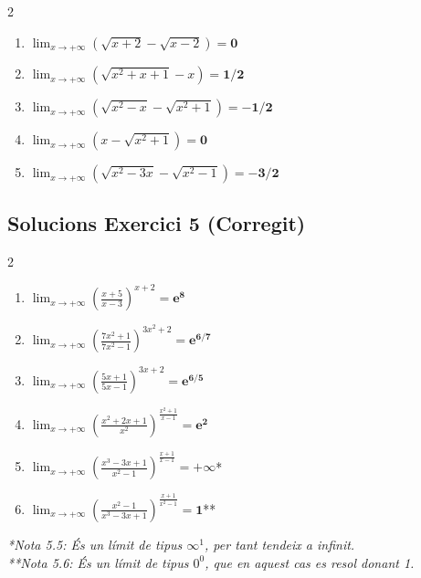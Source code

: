 \documentclass[12pt,a4paper]{article}
\begin{document}
\begin{multicols}{2}
\begin{enumerate}[label=4.\arabic*]
    \item $\displaystyle \lim_{x \to +\infty} (\sqrt{x+2}-\sqrt{x-2}) = \mathbf{0}$
    \item $\displaystyle \lim_{x \to +\infty} (\sqrt{x^2+x+1}-x) = \mathbf{1/2}$
    \item $\displaystyle \lim_{x \to +\infty} (\sqrt{x^2-x}-\sqrt{x^2+1}) = \mathbf{-1/2}$
    \item $\displaystyle \lim_{x \to +\infty} (x-\sqrt{x^2+1}) = \mathbf{0}$
    \item $\displaystyle \lim_{x \to +\infty} (\sqrt{x^2-3x}-\sqrt{x^2-1}) = \mathbf{-3/2}$
\end{enumerate}
\end{multicols}

\subsection*{Solucions Exercici 5 (Corregit)}
\begin{multicols}{2}
\begin{enumerate}[label=5.\arabic*]
    \item $\displaystyle \lim_{x \to +\infty} \left(\frac{x+5}{x-3}\right)^{x+2} = \mathbf{e^8}$
    \item $\displaystyle \lim_{x \to +\infty} \left(\frac{7x^2+1}{7x^2-1}\right)^{3x^2+2} = \mathbf{e^{6/7}}$
    \item $\displaystyle \lim_{x \to +\infty} \left(\frac{5x+1}{5x-1}\right)^{3x+2} = \mathbf{e^{6/5}}$
    \item $\displaystyle \lim_{x \to +\infty} \left(\frac{x^2+2x+1}{x^2}\right)^{\frac{x^2+1}{x-1}} = \mathbf{e^2}$
    \item $\displaystyle \lim_{x \to +\infty} \left(\frac{x^3-3x+1}{x^2-1}\right)^{\frac{x+1}{x-1}} = \mathbf{+\infty}$*
    \item $\displaystyle \lim_{x \to +\infty} \left(\frac{x^2-1}{x^3-3x+1}\right)^{\frac{x+1}{x^2-1}} = \mathbf{1}$**
\end{enumerate}
\end{multicols}
\textit{*Nota 5.5: És un límit de tipus $\infty^1$, per tant tendeix a infinit.}\\
\textit{**Nota 5.6: És un límit de tipus $0^0$, que en aquest cas es resol donant 1.}
\end{document}
